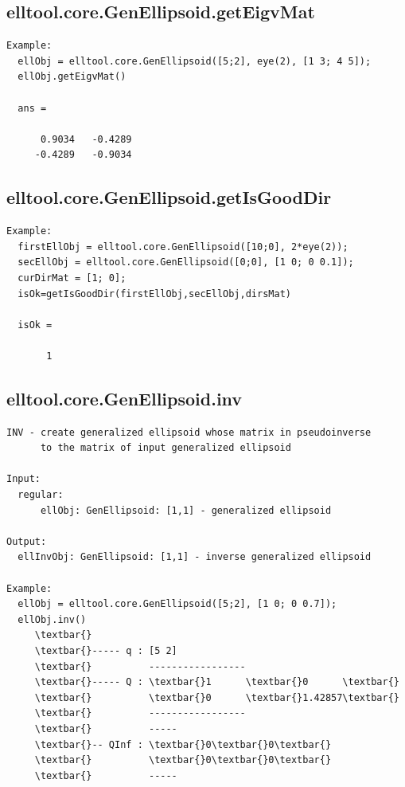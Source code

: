 \documentclass[letterpaper,10pt,english]{sphinxmanual}
\begin{document}
\subsection{elltool.core.GenEllipsoid.getEigvMat}
\label{chap_functions:elltool-core-genellipsoid-geteigvmat}
\begin{Verbatim}[commandchars=\\\{\}]
Example:
  ellObj = elltool.core.GenEllipsoid([5;2], eye(2), [1 3; 4 5]);
  ellObj.getEigvMat()

  ans =

      0.9034   -0.4289
     -0.4289   -0.9034
\end{Verbatim}


\subsection{elltool.core.GenEllipsoid.getIsGoodDir}
\label{chap_functions:elltool-core-genellipsoid-getisgooddir}
\begin{Verbatim}[commandchars=\\\{\}]
Example:
  firstEllObj = elltool.core.GenEllipsoid([10;0], 2*eye(2));
  secEllObj = elltool.core.GenEllipsoid([0;0], [1 0; 0 0.1]);
  curDirMat = [1; 0];
  isOk=getIsGoodDir(firstEllObj,secEllObj,dirsMat)

  isOk =

       1
\end{Verbatim}


\subsection{elltool.core.GenEllipsoid.inv}
\label{chap_functions:elltool-core-genellipsoid-inv}
\begin{Verbatim}[commandchars=\\\{\}]
INV - create generalized ellipsoid whose matrix in pseudoinverse
      to the matrix of input generalized ellipsoid

Input:
  regular:
      ellObj: GenEllipsoid: [1,1] - generalized ellipsoid

Output:
  ellInvObj: GenEllipsoid: [1,1] - inverse generalized ellipsoid

Example:
  ellObj = elltool.core.GenEllipsoid([5;2], [1 0; 0 0.7]);
  ellObj.inv()
     \textbar{}
     \textbar{}----- q : [5 2]
     \textbar{}          -----------------
     \textbar{}----- Q : \textbar{}1      \textbar{}0      \textbar{}
     \textbar{}          \textbar{}0      \textbar{}1.42857\textbar{}
     \textbar{}          -----------------
     \textbar{}          -----
     \textbar{}-- QInf : \textbar{}0\textbar{}0\textbar{}
     \textbar{}          \textbar{}0\textbar{}0\textbar{}
     \textbar{}          -----
\end{Verbatim}
\end{document}
